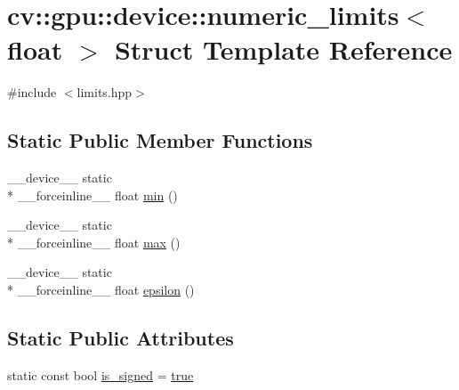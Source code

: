 \hypertarget{structcv_1_1gpu_1_1device_1_1numeric__limits_3_01float_01_4}{\section{cv\-:\-:gpu\-:\-:device\-:\-:numeric\-\_\-limits$<$ float $>$ Struct Template Reference}
\label{structcv_1_1gpu_1_1device_1_1numeric__limits_3_01float_01_4}
}


{\ttfamily \#include $<$limits.\-hpp$>$}

\subsection*{Static Public Member Functions}
\begin{DoxyCompactItemize}
\item 
\-\_\-\-\_\-device\-\_\-\-\_\- static \\*
\-\_\-\-\_\-forceinline\-\_\-\-\_\- float \hyperlink{structcv_1_1gpu_1_1device_1_1numeric__limits_3_01float_01_4_ae9910bb1fdc5394eccd616c9c1e1ff9c}{min} ()
\item 
\-\_\-\-\_\-device\-\_\-\-\_\- static \\*
\-\_\-\-\_\-forceinline\-\_\-\-\_\- float \hyperlink{structcv_1_1gpu_1_1device_1_1numeric__limits_3_01float_01_4_a4a734bd3ff2f9cb7230e0e11127afb73}{max} ()
\item 
\-\_\-\-\_\-device\-\_\-\-\_\- static \\*
\-\_\-\-\_\-forceinline\-\_\-\-\_\- float \hyperlink{structcv_1_1gpu_1_1device_1_1numeric__limits_3_01float_01_4_a64601887acbe18851058abc903925658}{epsilon} ()
\end{DoxyCompactItemize}
\subsection*{Static Public Attributes}
\begin{DoxyCompactItemize}
\item 
static const bool \hyperlink{structcv_1_1gpu_1_1device_1_1numeric__limits_3_01float_01_4_a2a4c991ce771ecd2b7ef2cc92d628bd6}{is\-\_\-signed} = \hyperlink{namespacecv_1_1gpu_1_1device_ac34c172a7a1904fb0fd477321a31f926}{true}
\end{DoxyCompactItemize}


